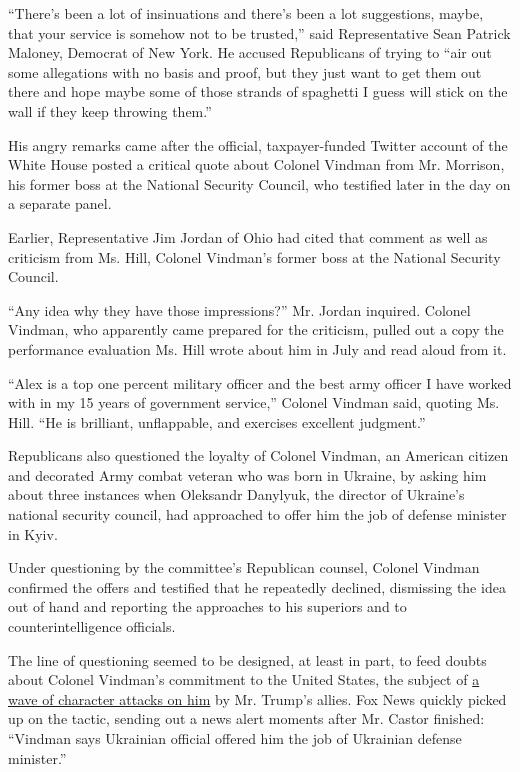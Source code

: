 ``There's been a lot of insinuations and there's been a lot suggestions,
maybe, that your service is somehow not to be trusted,'' said
Representative Sean Patrick Maloney, Democrat of New York. He accused
Republicans of trying to ``air out some allegations with no basis and
proof, but they just want to get them out there and hope maybe some of
those strands of spaghetti I guess will stick on the wall if they keep
throwing them.''

His angry remarks came after the official, taxpayer-funded Twitter
account of the White House posted a critical quote about Colonel Vindman
from Mr. Morrison, his former boss at the National Security Council, who
testified later in the day on a separate panel.

Earlier, Representative Jim Jordan of Ohio had cited that comment as
well as criticism from Ms. Hill, Colonel Vindman's former boss at the
National Security Council.

``Any idea why they have those impressions?'' Mr. Jordan inquired.
Colonel Vindman, who apparently came prepared for the criticism, pulled
out a copy the performance evaluation Ms. Hill wrote about him in July
and read aloud from it.

``Alex is a top one percent military officer and the best army officer I
have worked with in my 15 years of government service,'' Colonel Vindman
said, quoting Ms. Hill. ``He is brilliant, unflappable, and exercises
excellent judgment.''

Republicans also questioned the loyalty of Colonel Vindman, an American
citizen and decorated Army combat veteran who was born in Ukraine, by
asking him about three instances when Oleksandr Danylyuk, the director
of Ukraine's national security council, had approached to offer him the
job of defense minister in Kyiv.

Under questioning by the committee's Republican counsel, Colonel Vindman
confirmed the offers and testified that he repeatedly declined,
dismissing the idea out of hand and reporting the approaches to his
superiors and to counterintelligence officials.

The line of questioning seemed to be designed, at least in part, to feed
doubts about Colonel Vindman's commitment to the United States, the
subject of
\href{https://www.nytimes.com/2019/11/06/us/politics/trump-vindman-twitter.html}{a
wave of character attacks on him} by Mr. Trump's allies. Fox News
quickly picked up on the tactic, sending out a news alert moments after
Mr. Castor finished: ``Vindman says Ukrainian official offered him the
job of Ukrainian defense minister.''

